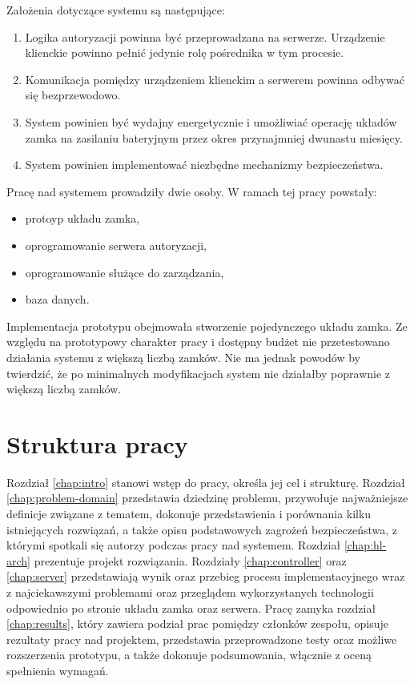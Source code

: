 		Założenia dotyczące systemu są następujące:

		\begin{enumerate}
		    \item Logika autoryzacji powinna być przeprowadzana na serwerze. Urządzenie klienckie powinno pełnić jedynie rolę pośrednika w tym procesie.
		    \item Komunikacja pomiędzy urządzeniem klienckim a serwerem powinna odbywać się bezprzewodowo.
		    \item System powinien być wydajny energetycznie i umożliwiać operację układów zamka na zasilaniu bateryjnym przez okres przynajmniej dwunastu miesięcy.
		    \item System powinien implementować niezbędne mechanizmy bezpieczeństwa.
		\end{enumerate}

		Pracę nad systemem prowadziły dwie osoby. W ramach tej pracy powstały:

		\begin{itemize}
		    \item protoyp układu zamka,
		    \item oprogramowanie serwera autoryzacji,
		    \item oprogramowanie służące do zarządzania,
		    \item baza danych.
		\end{itemize}

		Implementacja prototypu obejmowała stworzenie pojedynczego układu zamka. Ze względu na prototypowy charakter pracy i dostępny budżet nie przetestowano działania systemu z większą liczbą zamków. Nie ma jednak powodów by twierdzić, że po minimalnych modyfikacjach system nie działałby poprawnie z większą liczbą zamków.

	\section{Struktura pracy}

		Rozdział \ref{chap:intro} stanowi wstęp do pracy, określa jej cel i strukturę. Rozdział \ref{chap:problem-domain} przedstawia dziedzinę problemu, przywołuje najważniejsze definicje związane z tematem, dokonuje przedstawienia i porównania kilku istniejących rozwiązań, a także opisu podstawowych zagrożeń bezpieczeństwa, z którymi spotkali się autorzy podczas pracy nad systemem. Rozdział \ref{chap:hl-arch} prezentuje projekt rozwiązania. Rozdziały \ref{chap:controller} oraz \ref{chap:server} przedstawiają wynik oraz przebieg procesu implementacyjnego wraz z najciekawszymi problemami oraz przeglądem wykorzystanych technologii odpowiednio po stronie układu zamka oraz serwera. Pracę zamyka rozdział \ref{chap:results}, który zawiera podział prac pomiędzy członków zespołu, opisuje rezultaty pracy nad projektem, przedstawia przeprowadzone testy oraz możliwe rozszerzenia prototypu, a także dokonuje podsumowania, włącznie z oceną spełnienia wymagań. 